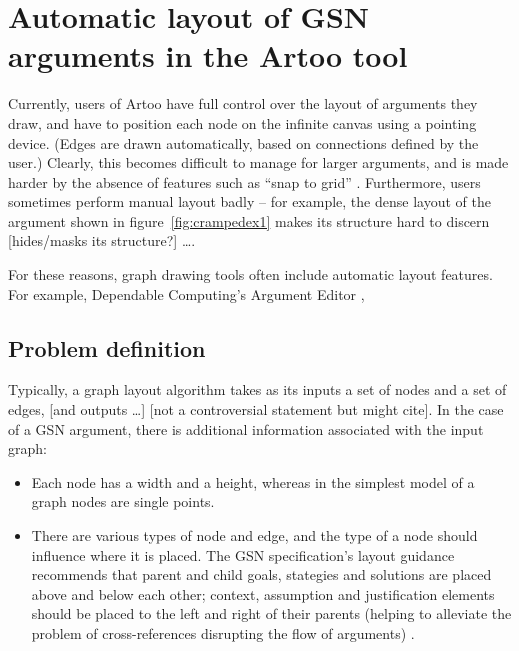 \section{Automatic layout of GSN arguments in the Artoo tool}

Currently, users of Artoo have full control over the layout of arguments they draw, and have to position each node on the infinite canvas using a pointing device.
(Edges are drawn automatically, based on connections defined  by the user.)
Clearly, this becomes difficult to manage for larger arguments, and is made harder by the absence of features such as ``snap to grid'' .
Furthermore, users sometimes perform manual layout badly -- for example, the dense layout of the argument shown in figure~\ref{fig:crampedex1} makes its structure hard to discern [hides/masks its structure?] \ldots {}.

For these reasons, graph drawing tools often include automatic layout features. For example, Dependable Computing's Argument Editor , 



\subsection{Problem definition}

Typically, a graph layout algorithm takes as its inputs a set of nodes and a set of edges, [and outputs \ldots] [not a controversial statement but might cite].
In the case of a GSN argument, there is additional information associated with the input graph:

\begin{itemize}
  \item
    Each node has a width and a height, whereas in the simplest model of a graph nodes are single points. 
  \item
    There are various types of node and edge, and the type of a node should influence where it is placed. The GSN specification's layout guidance \citep[section~2.2, pp.~26--27]{gsnstandard} recommends that parent and child goals, stategies and solutions are placed above and below each other; context, assumption and justification elements should be placed to the left and right of their parents (helping to alleviate the problem of cross-references disrupting the flow of arguments) .
\end{itemize}

